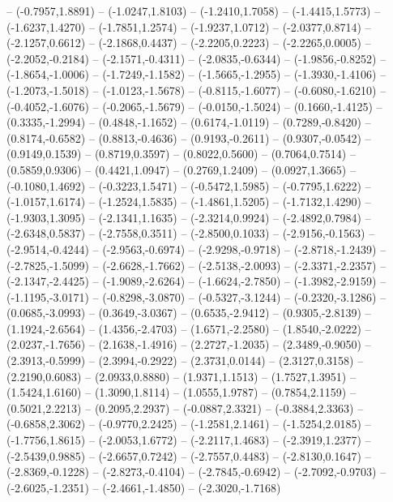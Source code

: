 {	-- (-0.7957,1.8891)
	-- (-1.0247,1.8103)
	-- (-1.2410,1.7058)
	-- (-1.4415,1.5773)
	-- (-1.6237,1.4270)
	-- (-1.7851,1.2574)
	-- (-1.9237,1.0712)
	-- (-2.0377,0.8714)
	-- (-2.1257,0.6612)
	-- (-2.1868,0.4437)
	-- (-2.2205,0.2223)
	-- (-2.2265,0.0005)
	-- (-2.2052,-0.2184)
	-- (-2.1571,-0.4311)
	-- (-2.0835,-0.6344)
	-- (-1.9856,-0.8252)
	-- (-1.8654,-1.0006)
	-- (-1.7249,-1.1582)
	-- (-1.5665,-1.2955)
	-- (-1.3930,-1.4106)
	-- (-1.2073,-1.5018)
	-- (-1.0123,-1.5678)
	-- (-0.8115,-1.6077)
	-- (-0.6080,-1.6210)
	-- (-0.4052,-1.6076)
	-- (-0.2065,-1.5679)
	-- (-0.0150,-1.5024)
	-- (0.1660,-1.4125)
	-- (0.3335,-1.2994)
	-- (0.4848,-1.1652)
	-- (0.6174,-1.0119)
	-- (0.7289,-0.8420)
	-- (0.8174,-0.6582)
	-- (0.8813,-0.4636)
	-- (0.9193,-0.2611)
	-- (0.9307,-0.0542)
	-- (0.9149,0.1539)
	-- (0.8719,0.3597)
	-- (0.8022,0.5600)
	-- (0.7064,0.7514)
	-- (0.5859,0.9306)
	-- (0.4421,1.0947)
	-- (0.2769,1.2409)
	-- (0.0927,1.3665)
	-- (-0.1080,1.4692)
	-- (-0.3223,1.5471)
	-- (-0.5472,1.5985)
	-- (-0.7795,1.6222)
	-- (-1.0157,1.6174)
	-- (-1.2524,1.5835)
	-- (-1.4861,1.5205)
	-- (-1.7132,1.4290)
	-- (-1.9303,1.3095)
	-- (-2.1341,1.1635)
	-- (-2.3214,0.9924)
	-- (-2.4892,0.7984)
	-- (-2.6348,0.5837)
	-- (-2.7558,0.3511)
	-- (-2.8500,0.1033)
	-- (-2.9156,-0.1563)
	-- (-2.9514,-0.4244)
	-- (-2.9563,-0.6974)
	-- (-2.9298,-0.9718)
	-- (-2.8718,-1.2439)
	-- (-2.7825,-1.5099)
	-- (-2.6628,-1.7662)
	-- (-2.5138,-2.0093)
	-- (-2.3371,-2.2357)
	-- (-2.1347,-2.4425)
	-- (-1.9089,-2.6264)
	-- (-1.6624,-2.7850)
	-- (-1.3982,-2.9159)
	-- (-1.1195,-3.0171)
	-- (-0.8298,-3.0870)
	-- (-0.5327,-3.1244)
	-- (-0.2320,-3.1286)
	-- (0.0685,-3.0993)
	-- (0.3649,-3.0367)
	-- (0.6535,-2.9412)
	-- (0.9305,-2.8139)
	-- (1.1924,-2.6564)
	-- (1.4356,-2.4703)
	-- (1.6571,-2.2580)
	-- (1.8540,-2.0222)
	-- (2.0237,-1.7656)
	-- (2.1638,-1.4916)
	-- (2.2727,-1.2035)
	-- (2.3489,-0.9050)
	-- (2.3913,-0.5999)
	-- (2.3994,-0.2922)
	-- (2.3731,0.0144)
	-- (2.3127,0.3158)
	-- (2.2190,0.6083)
	-- (2.0933,0.8880)
	-- (1.9371,1.1513)
	-- (1.7527,1.3951)
	-- (1.5424,1.6160)
	-- (1.3090,1.8114)
	-- (1.0555,1.9787)
	-- (0.7854,2.1159)
	-- (0.5021,2.2213)
	-- (0.2095,2.2937)
	-- (-0.0887,2.3321)
	-- (-0.3884,2.3363)
	-- (-0.6858,2.3062)
	-- (-0.9770,2.2425)
	-- (-1.2581,2.1461)
	-- (-1.5254,2.0185)
	-- (-1.7756,1.8615)
	-- (-2.0053,1.6772)
	-- (-2.2117,1.4683)
	-- (-2.3919,1.2377)
	-- (-2.5439,0.9885)
	-- (-2.6657,0.7242)
	-- (-2.7557,0.4483)
	-- (-2.8130,0.1647)
	-- (-2.8369,-0.1228)
	-- (-2.8273,-0.4104)
	-- (-2.7845,-0.6942)
	-- (-2.7092,-0.9703)
	-- (-2.6025,-1.2351)
	-- (-2.4661,-1.4850)
	-- (-2.3020,-1.7168)
}
